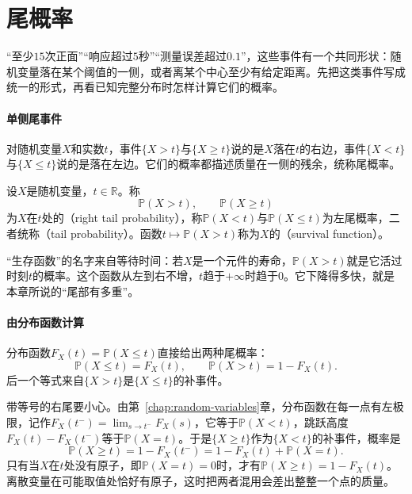 \section{尾概率}
\label{sec:tail-events}

“至少$15$次正面”“响应超过$5$秒”“测量误差超过$0.1$”，这些事件有一个共同形状：随机变量落在某个阈值的一侧，或者离某个中心至少有给定距离。先把这类事件写成统一的形式，再看已知完整分布时怎样计算它们的概率。

\paragraph{单侧尾事件}
对随机变量$X$和实数$t$，事件$\{X>t\}$与$\{X\geq t\}$说的是$X$落在$t$的右边，事件$\{X<t\}$与$\{X\leq t\}$说的是落在左边。它们的概率都描述质量在一侧的残余，统称尾概率。

\begin{definition}[尾概率]
\label{def:tail-probability}
设$X$是随机变量，$t\in\mathbb{R}$。称
\begin{equation}
 \mathbb{P}(X>t),\qquad \mathbb{P}(X\geq t)
 \label{eq:tail-right}
\end{equation}
为$X$在$t$处的（right tail probability），称$\mathbb{P}(X<t)$与$\mathbb{P}(X\leq t)$为左尾概率，二者统称（tail probability）。函数$t\mapsto\mathbb{P}(X>t)$称为$X$的（survival function）。
\end{definition}

“生存函数”的名字来自等待时间：若$X$是一个元件的寿命，$\mathbb{P}(X>t)$就是它活过时刻$t$的概率。这个函数从左到右不增，$t$趋于$+\infty$时趋于$0$。它下降得多快，就是本章所说的“尾部有多重”。

\paragraph{由分布函数计算}
分布函数$F_X(t)=\mathbb{P}(X\leq t)$直接给出两种尾概率：
\begin{equation}
 \mathbb{P}(X\leq t)=F_X(t),\qquad \mathbb{P}(X>t)=1-F_X(t).
 \label{eq:tail-from-cdf}
\end{equation}
后一个等式来自$\{X>t\}$是$\{X\leq t\}$的补事件。

带等号的右尾要小心。由第~\ref{chap:random-variables}章，分布函数在每一点有左极限，记作$F_X(t^-)=\lim_{s\to t^-}F_X(s)$，它等于$\mathbb{P}(X<t)$，跳跃高度$F_X(t)-F_X(t^-)$等于$\mathbb{P}(X=t)$。于是$\{X\geq t\}$作为$\{X<t\}$的补事件，概率是
\begin{equation}
 \mathbb{P}(X\geq t)=1-F_X(t^-)=1-F_X(t)+\mathbb{P}(X=t).
 \label{eq:tail-closed}
\end{equation}
只有当$X$在$t$处没有原子，即$\mathbb{P}(X=t)=0$时，才有$\mathbb{P}(X\geq t)=1-F_X(t)$。离散变量在可能取值处恰好有原子，这时把两者混用会差出整整一个点的质量。

